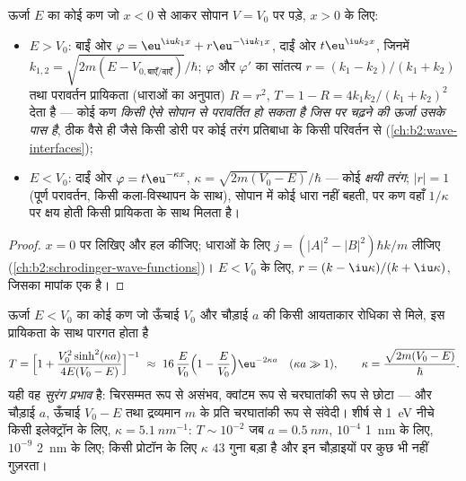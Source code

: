 \begin{proposition}[विभव सोपान]\label{prop:b2:potential-wells-tunneling:step}
ऊर्जा $E$ का कोई कण जो $x < 0$ से आकर सोपान $V = V_0$ पर पड़े,
$x > 0$ के लिए:
\begin{itemize}
\item $E > V_0$: बाईं ओर $\varphi = \eu^{\iu k_1x} + r\eu^{-\iu k_1x}$, दाईं ओर $t\eu^{\iu
      k_2x}$, जिनमें $k_{1,2} = \sqrt{2m(E - V_{0,\text{बाएँ/दाएँ}})}/
      \hbar$; $\varphi$ और $\varphi'$ का सांतत्य $r = (k_1 - k_2)/(k_1
      + k_2)$ तथा परावर्तन प्रायिकता (धाराओं का अनुपात) $R = r^2$,
      $T = 1 - R = 4k_1k_2/(k_1 + k_2)^2$ देता है --- कोई कण \emph{किसी ऐसे सोपान से
      परावर्तित हो सकता है जिस पर चढ़ने की ऊर्जा उसके पास है}, ठीक वैसे ही जैसे किसी डोरी पर कोई तरंग
      प्रतिबाधा के किसी परिवर्तन से (\cref{ch:b2:wave-interfaces});
\item $E < V_0$: दाईं ओर $\varphi = t\eu^{-\kappa x}$, $\kappa = \sqrt{2m(V_0
      - E)}/\hbar$ --- कोई \emph{क्षयी तरंग}; $|r| = 1$ (पूर्ण परावर्तन, किसी कला-विस्थापन के साथ), सोपान में कोई
      धारा नहीं बहती, पर कण वहाँ $1/\kappa$ पर क्षय होती किसी
      प्रायिकता के साथ मिलता है।
\end{itemize}
\end{proposition}

\begin{proof}
$x = 0$ पर  लिखिए और हल कीजिए; धाराओं के लिए
$j = (|A|^2 - |B|^2)\hbar k/m$ लीजिए (\cref{ch:b2:schrodinger-wave-functions})।
$E < V_0$ के लिए, $r = (k - \iu\kappa)/(k + \iu\kappa)$, जिसका मापांक एक है।
\end{proof}

\begin{theorem}[किसी रोधिका से होकर सुरंगन]\label{thm:b2:potential-wells-tunneling:tunnel}
ऊर्जा $E < V_0$ का कोई कण जो ऊँचाई $V_0$ और चौड़ाई $a$ की किसी आयताकार
रोधिका से मिले, इस प्रायिकता के साथ पारगत होता है
\[
T = \Big[1 + \frac{V_0^2\sinh^2(\kappa a)}{4E(V_0 - E)}\Big]^{-1}
\ \approx\ 16\,\frac{E}{V_0}\Big(1 - \frac{E}{V_0}\Big)\eu^{-2\kappa a}
\quad (\kappa a \gg 1), \qquad
\kappa = \frac{\sqrt{2m(V_0 - E)}}{\hbar} .
\]
यही वह \emph{सुरंग प्रभाव} है: चिरसम्मत रूप से
असंभव, क्वांटम रूप से चरघातांकी रूप से छोटा --- और चौड़ाई $a$, ऊँचाई $V_0 - E$ तथा
द्रव्यमान $m$ के प्रति चरघातांकी रूप से संवेदी। शीर्ष से \qty{1}{eV} नीचे किसी इलेक्ट्रॉन के लिए, $\kappa = \qty{5.1}{nm^{-1}}$:
$T \sim 10^{-2}$ जब $a = \qty{0.5}{nm}$, $10^{-4}$ \qty{1}{nm} के लिए,
$10^{-9}$ \qty{2}{nm} के लिए; किसी प्रोटॉन के लिए $\kappa$ $43$ गुना बड़ा है और इन चौड़ाइयों पर
कुछ भी नहीं गुज़रता।
\end{theorem}

